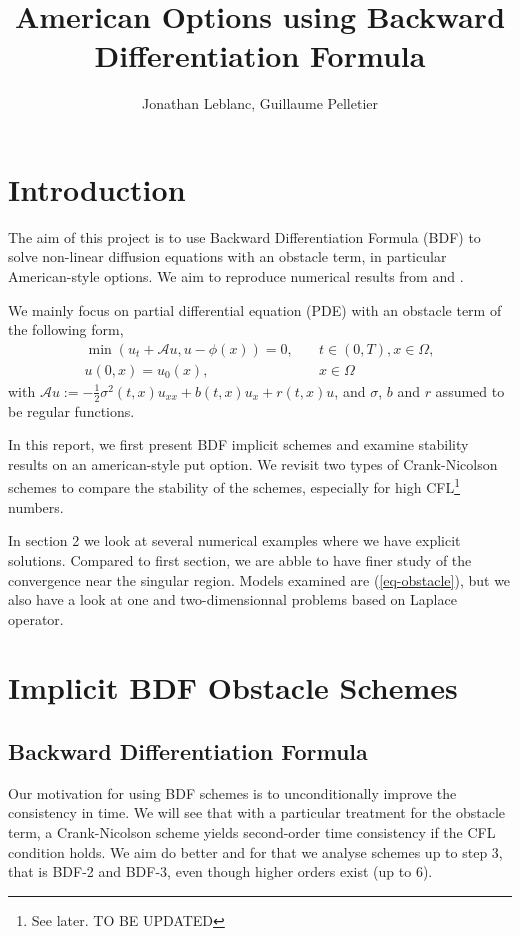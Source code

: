 \documentclass[12pt,a4paper]{article}
\author{Jonathan Leblanc, Guillaume Pelletier}
\title{American Options using Backward Differentiation Formula}
\begin{document}
\maketitle
\newpage

\section{Introduction}

The aim of this project is to use Backward Differentiation Formula (BDF) to solve non-linear diffusion equations with an obstacle term, in particular American-style options. We aim to reproduce numerical results from \cite{Boka} and \cite{Oosterlee}.

We mainly focus on partial differential equation (PDE) with an obstacle term of the following form,
\begin{align}
	\min \left( u_t + \mathcal{A} u, u - \phi(x) \right) = 0,& \quad t \in (0,T), x \in \Omega, \label{eq-obstacle}\\
	u(0, x) = u_0(x),& \quad x \in \Omega \label{eq-obstacle_initcond}
\end{align}
with $\mathcal{A}u := -\frac{1}{2} \sigma^2(t,x) u_{xx} + b(t,x) u_x + r(t,x) u$, and $\sigma$, $b$ and $r$ assumed to be regular functions.

In this report, we first present BDF implicit schemes and examine stability results on an american-style put option. We revisit two types of Crank-Nicolson schemes to compare the stability of the schemes, especially for high CFL\footnote{See later. TO BE UPDATED} numbers.

In section 2 we look at several numerical examples where we have explicit solutions. Compared to first section, we are abble to have finer study of the convergence near the singular region. Models examined are (\ref{eq-obstacle}), but we also have a look at one and two-dimensionnal problems based on Laplace operator.

\section{Implicit BDF Obstacle Schemes}

	\subsection{Backward Differentiation Formula}

Our motivation for using BDF schemes is to unconditionally improve the consistency in time. We will see that with a particular treatment for the obstacle term, a Crank-Nicolson scheme yields second-order time consistency if the CFL condition holds. We aim do better and for that we analyse schemes up to step 3, that is BDF-2 and BDF-3, even though higher orders exist (up to 6).
\end{document}
